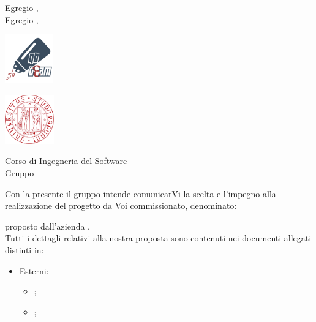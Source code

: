 \documentclass[12pt]{letter}
\begin{document}
    \begin{letter}
        { Egregio \VT{},\\Egregio \CR{},}
        \begin{minipage}{.5\textwidth}
            \begin{flushleft}
                \includegraphics[width=.4\linewidth, height=80px]{../Utilita/Immagini/qbteam.png}
            \end{flushleft}
        \end{minipage}
        \begin{minipage}{.5\textwidth}
            \begin{flushright}
                \includegraphics[width=.4\linewidth, height=80px]{../Utilita/Immagini/LogoUniPD.png}
            \end{flushright}
        \end{minipage}
        {    
        \begin{flushleft}
            Corso di Ingegneria del Software\\ Gruppo \Gruppo{}\\ 
        \end{flushleft}
        }
        \opening{ Con la presente il gruppo \Gruppo{} intende comunicarVi la scelta e l'impegno alla realizzazione del progetto da Voi commissionato, denominato:}
        \begin{center}
           \textbf{\NomeProgetto{}} 
        \end{center}
        proposto dall'azienda \textbf{\Proponente{}}.\\
        Tutti i dettagli relativi alla nostra proposta sono contenuti nei documenti allegati distinti in: \\
        \begin{itemize}
        \item Esterni:
        \begin{itemize}
            \item \AdR{};
            \item \Glossario{};

\end{itemize}
\end{itemize}
\end{letter}
\end{document}
